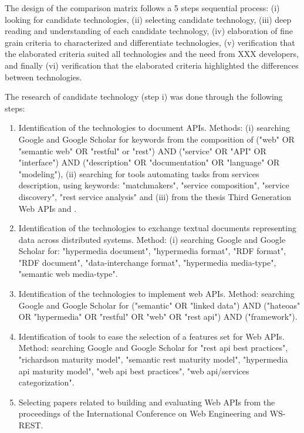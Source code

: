 

The design of the comparison matrix follows a 5 steps sequential process: (i) looking for candidate technologies, (ii) selecting candidate technology, (iii) deep reading and understanding of each candidate technology, (iv) elaboration of fine grain criteria to characterized and differentiate technologies, (v) verification that the elaborated criteria suited all technologies and the need from XXX developers, and finally (vi) verification that the elaborated criteria highlighted the differences between technologies.

The research of candidate technology (step i) was done through the following steps:

\begin{enumerate}
    \item Identification of the technologies to document APIs. Methods: (i) searching Google and Google Scholar for keywords from the composition of ("web" OR "semantic web" OR "restful" or "rest") AND ("service" OR "API" OR "interface") AND ("description" OR "documentation" OR "language" OR "modeling"), (ii) searching for tools automating tasks from services description, using keywords: "matchmakers", "service composition", "service discovery", "rest service analysis" and (iii) from the thesis Third Generation Web APIs \cite{lanthalerthird} and \cite{scherer2016description}.
    \item Identification of the technologies to exchange textual documents representing data across distributed systems. Method: (i) searching Google and Google Scholar for: "hypermedia document", "hypermedia format", "RDF format", "RDF document", "data-interchange format", "hypermedia media-type", "semantic web media-type".
    \item Identification of the technologies to implement web APIs. Method: searching Google and Google Scholar for ("semantic" OR "linked data") AND ("hateoas" OR "hypermedia" OR "restful" OR "web" OR "rest api") AND ("framework").
    \item Identification of tools to ease the selection of a features set for Web APIs. Method: searching Google and Google Scholar for "rest api best practices", "richardson maturity model", "semantic rest maturity model", "hypermedia api maturity model", "web api best practices", "web api/services categorization".
    \item Selecting papers related to building and evaluating Web APIs from the proceedings of the International Conference on Web Engineering and WS-REST.
\end{enumerate}

